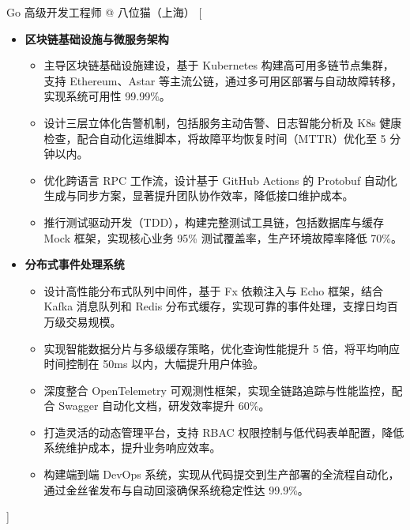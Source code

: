 \documentclass[zh]{resume}
\begin{document}
\begin{experiences}
    {Go 高级开发工程师 @ 八位猫（上海）}%
    [\begin{itemize}
      \item \textbf{区块链基础设施与微服务架构}
        \begin{itemize}
          \item 主导区块链基础设施建设，基于 Kubernetes 构建高可用多链节点集群，支持 Ethereum、Astar 等主流公链，通过多可用区部署与自动故障转移，实现系统可用性 99.99\%。
          \item 设计三层立体化告警机制，包括服务主动告警、日志智能分析及 K8s 健康检查，配合自动化运维脚本，将故障平均恢复时间（MTTR）优化至 5 分钟以内。
          \item 优化跨语言 RPC 工作流，设计基于 GitHub Actions 的 Protobuf 自动化生成与同步方案，显著提升团队协作效率，降低接口维护成本。
          \item 推行测试驱动开发（TDD），构建完整测试工具链，包括数据库与缓存 Mock 框架，实现核心业务 95\% 测试覆盖率，生产环境故障率降低 70\%。
        \end{itemize}
      \item \textbf{分布式事件处理系统}
        \begin{itemize}
          \item 设计高性能分布式队列中间件，基于 Fx 依赖注入与 Echo 框架，结合 Kafka 消息队列和 Redis 分布式缓存，实现可靠的事件处理，支撑日均百万级交易规模。
          \item 实现智能数据分片与多级缓存策略，优化查询性能提升 5 倍，将平均响应时间控制在 50ms 以内，大幅提升用户体验。
          \item 深度整合 OpenTelemetry 可观测性框架，实现全链路追踪与性能监控，配合 Swagger 自动化文档，研发效率提升 60\%。
          \item 打造灵活的动态管理平台，支持 RBAC 权限控制与低代码表单配置，降低系统维护成本，提升业务响应效率。
          \item 构建端到端 DevOps 系统，实现从代码提交到生产部署的全流程自动化，通过金丝雀发布与自动回滚确保系统稳定性达 99.9\%。
        \end{itemize}
      \end{itemize}]
\end{experiences}
\end{document}
